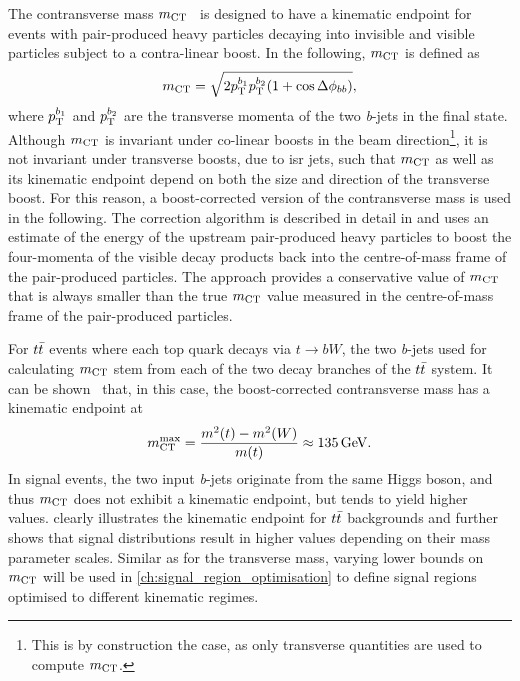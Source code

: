 The contransverse mass $m_{\textrm{CT}}$~\cite{Tovey:2008ui} is designed to have a kinematic endpoint for events with pair-produced heavy particles decaying into invisible and visible particles subject to a contra-linear boost. In the following, $m_{\textrm{CT}}$ is defined as
\begin{equation}
	m_{\textrm{CT}} = \sqrt{2p_{\textrm{T}}^{b_1}p_{\textrm{T}}^{b_2}(1+\cos\Delta\phi_{bb})},
\end{equation}
where $p_{\textrm{T}}^{b_1}$ and $p_{\textrm{T}}^{b_2}$ are the transverse momenta of the two \textit{b}-jets in the final state. Although $m_{\textrm{CT}}$ is invariant under co-linear boosts in the beam direction\footnote{This is by construction the case, as only transverse quantities are used to compute $m_{\textrm{CT}}$.}, it is not invariant under transverse boosts, \eg due to \gls{isr} jets, such that $m_{\textrm{CT}}$ as well as its kinematic endpoint depend on both the size and direction of the transverse boost. For this reason, a boost-corrected version of the contransverse mass is used in the following. The correction algorithm is described in detail in \cite{Polesello:2009rn} and uses an estimate of the energy of the upstream pair-produced heavy particles to boost the four-momenta of the visible decay products back into the centre-of-mass frame of the pair-produced particles. The approach provides a conservative value of $m_{\textrm{CT}}$ that is always smaller than the true $m_{\textrm{CT}}$ value measured in the centre-of-mass frame of the pair-produced particles.

For $t\bar{t}$ events where each top quark decays via $t\rightarrow bW$, the two \textit{b}-jets used for calculating $m_{\textrm{CT}}$ stem from each of the two decay branches of the $t\bar{t}$ system. It can be shown~\cite{Polesello:2009rn} that, in this case, the boost-corrected contransverse mass has a kinematic endpoint at
\begin{equation}
	\mct^\mathrm{max} = \frac{m^2(t) - m^2(W)}{m(t)} \approx \SI{135}{\GeV}.
\end{equation}
In signal events, the two input \textit{b}-jets originate from the same Higgs boson, and thus $m_{\textrm{CT}}$ does not exhibit a kinematic endpoint, but tends to yield higher values.  clearly illustrates the kinematic endpoint for $t\bar{t}$ backgrounds and further shows that signal distributions result in higher values depending on their mass parameter scales. Similar  as for the transverse mass, varying lower bounds on $m_{\textrm{CT}}$ will be used in \cref{ch:signal_region_optimisation} to define signal regions optimised to different kinematic regimes. 

